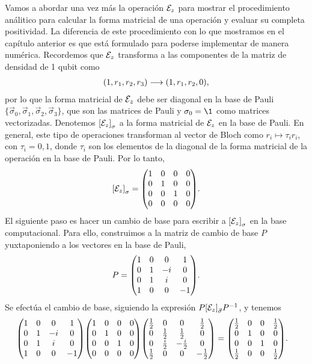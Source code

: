 Vamos a abordar una vez más la operación $\mathcal{E}_z$
para mostrar el procedimiento análitico para 
calcular la forma matricial de una operación 
y evaluar su completa positividad. La diferencia 
de este procedimiento con lo que mostramos en el
capítulo anterior es que está formulado para 
poderse implementar de manera numérica.
Recordemos que $\mathcal{E}_z$ transforma a las componentes 
de la matriz de densidad de 1 qubit como
\begin{align}
\qty(1,r_1,r_2,r_3)\longrightarrow\qty(1,r_1,r_2,0),
\end{align}
por lo que la forma matricial de $\mathcal{E}_z$ debe ser diagonal 
en la base de Pauli 
$\{ \vec{\sigma}_0,\vec{\sigma}_1,\vec{\sigma}_2,\vec{\sigma}_3\}$, 
que son las matrices de Pauli y $\sigma_0=\1$ como matrices vectorizadas.
Denotemos $\qty[\mathcal{E}_z]_{\sigma}$ a la forma matricial de
$\mathcal{E}_z$ en la base de Pauli. 
En general, este tipo de operaciones transforman al vector de Bloch
como $r_i\longmapsto \tau_ir_i$, con $\tau_i=0,1$, donde $\tau_i$ son 
los elementos de la diagonal de la forma matricial de la operación 
en la base de Pauli. Por lo tanto,
\begin{align}
\qty[\E_z]_{\sigma}=
\mqty(
 1 & 0 & 0 & 0 \\
 0 & 1 & 0 & 0 \\
 0 & 0 & 1 & 0 \\
 0 & 0 & 0 & 0 
).
\end{align}
El siguiente paso es hacer un cambio de base para escribir
a $\qty[\mathcal{E}_z]_{\sigma}$ en la base computacional.
Para ello, construimos a la matriz de cambio de base $P$
yuxtaponiendo a los vectores en la base de Pauli,
\begin{align}
P=\mqty(
 1 & 0 & 0 & 1 \\
 0 & 1 & -i & 0 \\
 0 & 1 & i & 0 \\
 1 & 0 & 0 & -1 
).
\end{align}
Se efectúa el cambio de base, siguiendo la expresión 
$P\qty[\mathcal{E}_z]_{\vec{\sigma}}P^{-1}$, y tenemos
\begin{align}
\mqty(
 1 & 0 & 0 & 1 \\
 0 & 1 & -i & 0 \\
 0 & 1 & i & 0 \\
 1 & 0 & 0 & -1 
)
\mqty(
 1 & 0 & 0 & 0 \\
 0 & 1 & 0 & 0 \\
 0 & 0 & 1 & 0 \\
 0 & 0 & 0 & 0 
)
\mqty(
 \frac{1}{2} & 0 & 0 & \frac{1}{2} \\
 0 & \frac{1}{2} & \frac{1}{2} & 0 \\
 0 & \frac{i}{2} & -\frac{i}{2} & 0 \\
 \frac{1}{2} & 0 & 0 & -\frac{1}{2} 
)
&=
\mqty(
 \frac{1}{2} & 0 & 0 & \frac{1}{2} \\
 0 & 1 & 0 & 0 \\
 0 & 0 & 1 & 0 \\
 \frac{1}{2} & 0 & 0 & \frac{1}{2} 
).
\end{align}

